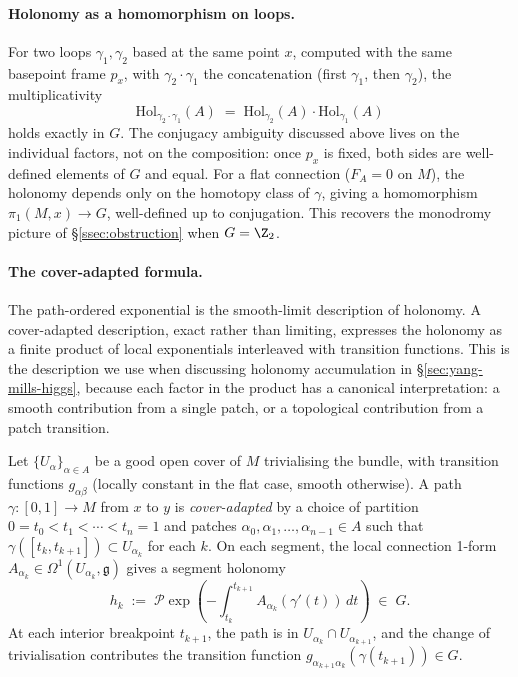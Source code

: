 \paragraph{Holonomy as a homomorphism on loops.} For two loops
$\gamma_1,\gamma_2$ based at the same point $x$, computed with the
same basepoint frame $p_x$, with $\gamma_2\cdot\gamma_1$ the
concatenation (first $\gamma_1$, then $\gamma_2$), the
multiplicativity
\[
   \mathrm{Hol}_{\gamma_2\cdot\gamma_1}(A)
   \;=\; \mathrm{Hol}_{\gamma_2}(A)\cdot \mathrm{Hol}_{\gamma_1}(A)
\]
holds exactly in $G$. The conjugacy ambiguity discussed above lives
on the individual factors, not on the composition: once $p_x$ is
fixed, both sides are well-defined elements of $G$ and equal. For a
flat
connection ($F_A=0$ on $M$), the holonomy depends only on the
homotopy class of $\gamma$, giving a homomorphism
$\pi_1(M,x)\to G$, well-defined up to conjugation. This recovers the
monodromy picture of \S\ref{ssec:obstruction} when $G=\Z_2$.

\paragraph{The cover-adapted formula.} The path-ordered exponential
is the smooth-limit description of holonomy. A cover-adapted
description, exact rather than limiting, expresses the holonomy as a
finite product of local exponentials interleaved with transition
functions. This is the description we use when discussing holonomy
accumulation in \S\ref{sec:yang-mills-higgs}, because each factor in
the product has a canonical interpretation: a smooth contribution
from a single patch, or a topological contribution from a patch
transition.

Let $\{U_\alpha\}_{\alpha\in A}$ be a good open cover of $M$
trivialising the bundle, with transition functions $g_{\alpha\beta}$
(locally constant in the flat case, smooth otherwise). A path
$\gamma\colon[0,1]\to M$ from $x$ to $y$ is \emph{cover-adapted} by a
choice of partition $0=t_0<t_1<\cdots<t_n=1$ and patches
$\alpha_0,\alpha_1,\dots,\alpha_{n-1}\in A$ such that
$\gamma([t_k,t_{k+1}])\subset U_{\alpha_k}$ for each $k$. On each
segment, the local connection 1-form $A_{\alpha_k}\in
\Omega^1(U_{\alpha_k},\mathfrak{g})$ gives a segment holonomy
\[
   h_k \;:=\; \mathcal{P}\exp\!\left(-\int_{t_k}^{t_{k+1}}
   A_{\alpha_k}(\gamma'(t))\,dt\right) \;\in\; G.
\]
At each interior breakpoint $t_{k+1}$, the path is in
$U_{\alpha_k}\cap U_{\alpha_{k+1}}$, and the change of trivialisation
contributes the transition function
$g_{\alpha_{k+1}\alpha_k}(\gamma(t_{k+1}))\in G$.

